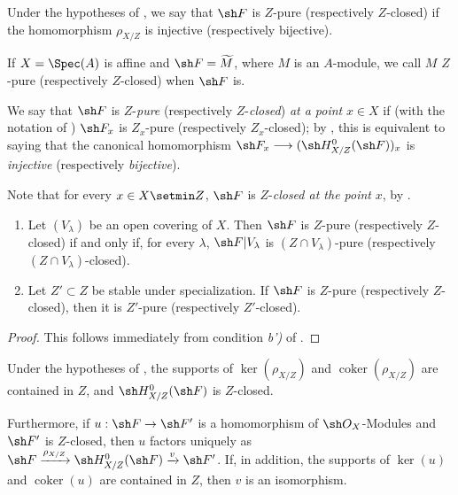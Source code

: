 \begin{definition}[5.9.9]
\label{IV.5.9.9}
Under the hypotheses of , we say that $\sh F$ is
$Z$-pure \textup{(respectively} $Z$-closed\textup{)} if the homomorphism
$\rho_{X/Z}$ is injective \textup{(respectively} bijective\textup{)}.
\end{definition}

If $X=\Spec(A)$ is affine and $\sh F=\widetilde M$, where $M$ is an
$A$-module, we call $M$ $Z$-pure (respectively $Z$-closed) when
$\sh F$ is.

We say that $\sh F$ is $Z$-\emph{pure} (respectively
$Z$-\emph{closed}) \emph{at a point} $x\in X$ if (with the notation
of ) $\sh F_x$ is $Z_x$-pure
(respectively $Z_x$-closed); by , this is equivalent
to saying that the canonical homomorphism
$\sh F_x\longrightarrow(\sh H^0_{X/Z}(\sh F))_x$
is \emph{injective} (respectively \emph{bijective}).

Note that for every $x\in X\setmin Z$, $\sh F$ is $Z$-\emph{closed at the
point} $x$, by .

\begin{corollary}[5.9.10]
\label{IV.5.9.10}
\begin{enumerate}[{\rm(i)}]
  \item\label{IV.5.9.10.i}
    Let $(V_\lambda)$ be an open covering of $X$.  Then $\sh F$ is
    $Z$-pure (\textup{respectively} $Z$-closed) if and only if, for every
    $\lambda$, $\sh F|V_\lambda$ is $(Z\cap V_\lambda)$-pure
    (\textup{respectively} $(Z\cap V_\lambda)$-closed).
  \item\label{IV.5.9.10.ii}
    Let $Z'\subset Z$ be stable under specialization.  If $\sh F$ is
    $Z$-pure (\textup{respectively} $Z$-closed), then it is $Z'$-pure
    (\textup{respectively} $Z'$-closed).
\end{enumerate}
\end{corollary}

\begin{proof}
This follows immediately from condition \emph{b')} of .
\end{proof}

\begin{proposition}[5.9.11]
\label{IV.5.9.11}
Under the hypotheses of , the supports of
$\ker(\rho_{X/Z})$ and $\operatorname{coker}(\rho_{X/Z})$ are
contained in $Z$, and $\sh H^0_{X/Z}(\sh F)$ is $Z$-closed.

Furthermore, if $u:\sh F\to\sh F'$ is a homomorphism of
$\sh O_X$-Modules and $\sh F'$ is $Z$-closed, then $u$ factors uniquely as $\sh F\xrightarrow{\rho_{X/Z}}\sh H^0_{X/Z}(\sh F)
\xrightarrow{v}\sh F'$.
If, in addition, the supports of $\ker(u)$ and $\operatorname{coker}(u)$
are contained in $Z$, then $v$ is an isomorphism.
\end{proposition}


